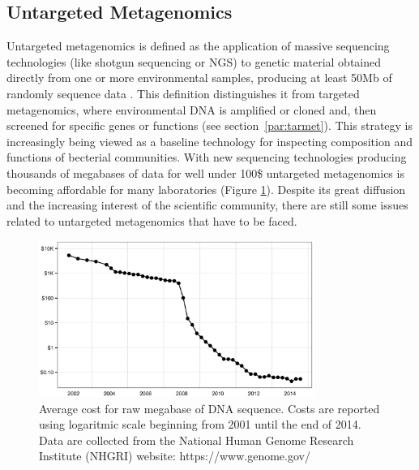 \subsection{Untargeted Metagenomics}
Untargeted metagenomics is defined as the application of massive sequencing technologies (like shotgun sequencing or NGS) to genetic material obtained directly from one or more environmental samples, producing at least 50Mb of randomly sequence data \cite{kunin2008bioinformatician}. This definition distinguishes it from targeted metagenomics, where environmental DNA is amplified or cloned and, then screened for specific genes or functions (see section~\ref{par:tarmet}). This strategy is increasingly being viewed as a baseline technology for inspecting composition and functions of becterial communities. With new sequencing technologies producing thousands of megabases of data for well under 100\$ untargeted metagenomics is becoming affordable for many laboratories (Figure \ref{fig:seqcost}). Despite its great diffusion and the increasing interest of the scientific community, there are still some issues related to untargeted metagenomics that have to be faced.\\%
\begin{figure}[!tb]
	\centering
	\includegraphics[width=0.8\textwidth]{./figures/Introduction/seq_cost}
  	\caption{Average cost for raw megabase of DNA sequence. Costs are reported using logaritmic scale beginning from 2001 until the end of 2014. Data are collected from the National Human Genome Research Institute (NHGRI) website: https://www.genome.gov/ \label{fig:seqcost}}
\end{figure}%
